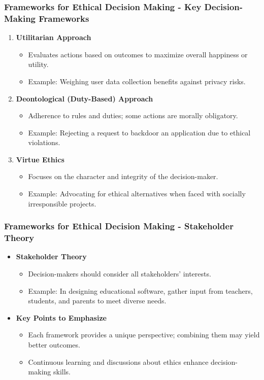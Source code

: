 \documentclass{beamer}
\begin{document}
\begin{frame}[fragile]
    \frametitle{Frameworks for Ethical Decision Making - Key Decision-Making Frameworks}
    \begin{enumerate}
        \item \textbf{Utilitarian Approach}
        \begin{itemize}
            \item Evaluates actions based on outcomes to maximize overall happiness or utility.
            \item Example: Weighing user data collection benefits against privacy risks.
        \end{itemize}

        \item \textbf{Deontological (Duty-Based) Approach}
        \begin{itemize}
            \item Adherence to rules and duties; some actions are morally obligatory.
            \item Example: Rejecting a request to backdoor an application due to ethical violations.
        \end{itemize}

        \item \textbf{Virtue Ethics}
        \begin{itemize}
            \item Focuses on the character and integrity of the decision-maker.
            \item Example: Advocating for ethical alternatives when faced with socially irresponsible projects.
        \end{itemize}
    \end{enumerate}
\end{frame}

\begin{frame}[fragile]
    \frametitle{Frameworks for Ethical Decision Making - Stakeholder Theory}
    \begin{itemize}
        \item \textbf{Stakeholder Theory}
        \begin{itemize}
            \item Decision-makers should consider all stakeholders' interests.
            \item Example: In designing educational software, gather input from teachers, students, and parents to meet diverse needs.
        \end{itemize}
        
        \item \textbf{Key Points to Emphasize}
        \begin{itemize}
            \item Each framework provides a unique perspective; combining them may yield better outcomes.
            \item Continuous learning and discussions about ethics enhance decision-making skills.
        \end{itemize}
    \end{itemize}
\end{frame}
\end{document}

